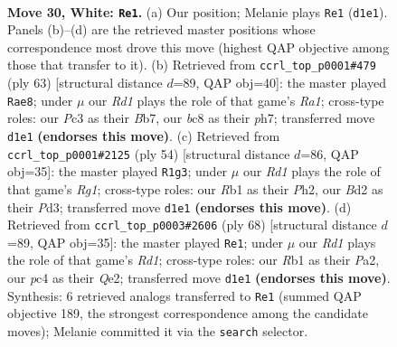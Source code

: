 \documentclass[11pt]{article}
\begin{document}
\clearpage

\begin{figure}[p]\centering
\begin{subfigure}{0.46\textwidth}\centering
\resizebox{\linewidth}{!}{%
\newchessgame
\chessboard[
  setfen={r1bq3k/8/8/4pr1p/2p4P/p1P3P1/P1QB4/1R1R2K1 w - - 2 30},
  showmover=false,
  pgfstyle=straightmove, color=movearrow, markmove={d1-e1}
]}
\caption{}
\end{subfigure}\hfill
\begin{subfigure}{0.46\textwidth}\centering
\resizebox{\linewidth}{!}{%
\newchessgame
\chessboard[
  setfen={r6k/1b5P/4rp1R/1p1q2p1/p2P4/B1P2PQ1/6P1/R5K1 b - - 0 32},
  showmover=false,
  pgfstyle=straightmove, color=movearrow, markmove={a8-e8}
]}
\caption{}
\end{subfigure}
\\[4pt]
\begin{subfigure}{0.46\textwidth}\centering
\resizebox{\linewidth}{!}{%
\newchessgame
\chessboard[
  setfen={1k1rr3/pp3pR1/7p/3p1q2/3Q1P2/P2P4/1P5P/1K4R1 w - - 1 28},
  showmover=false,
  pgfstyle=straightmove, color=movearrow, markmove={g1-g3}
]}
\caption{}
\end{subfigure}\hfill
\begin{subfigure}{0.46\textwidth}\centering
\resizebox{\linewidth}{!}{%
\newchessgame
\chessboard[
  setfen={8/5k1p/p1pq3B/3r1bP1/1P1P1p2/8/P3QP2/3R2K1 w - - 1 35},
  showmover=false,
  pgfstyle=straightmove, color=movearrow, markmove={d1-e1}
]}
\caption{}
\end{subfigure}
\caption{\textbf{Move 30, White: \texttt{Re1}.} (a) Our position; Melanie plays \texttt{Re1} (\texttt{d1e1}). Panels (b)--(d) are the retrieved master positions whose correspondence most drove this move (highest QAP objective among those that transfer to it). (b) Retrieved from \texttt{ccrl\_top\_p0001\#479} (ply 63) [structural distance $d$=89, QAP obj=40]: the master played \texttt{Rae8}; under $\mu$ our \emph{Rd1} plays the role of that game's \emph{Ra1}; cross-type roles: our \emph{P}c3 as their \emph{B}b7, our \emph{b}c8 as their \emph{p}h7; transferred move \texttt{d1e1} \textbf{(endorses this move)}. (c) Retrieved from \texttt{ccrl\_top\_p0001\#2125} (ply 54) [structural distance $d$=86, QAP obj=35]: the master played \texttt{R1g3}; under $\mu$ our \emph{Rd1} plays the role of that game's \emph{Rg1}; cross-type roles: our \emph{R}b1 as their \emph{P}h2, our \emph{B}d2 as their \emph{P}d3; transferred move \texttt{d1e1} \textbf{(endorses this move)}. (d) Retrieved from \texttt{ccrl\_top\_p0003\#2606} (ply 68) [structural distance $d$=89, QAP obj=35]: the master played \texttt{Re1}; under $\mu$ our \emph{Rd1} plays the role of that game's \emph{Rd1}; cross-type roles: our \emph{R}b1 as their \emph{P}a2, our \emph{p}c4 as their \emph{Q}e2; transferred move \texttt{d1e1} \textbf{(endorses this move)}. Synthesis: 6 retrieved analogs transferred to \texttt{Re1} (summed QAP objective 189, the strongest correspondence among the candidate moves); Melanie committed it via the \texttt{search} selector.}
\label{fig:thought-m58}
\end{figure}
\end{document}
